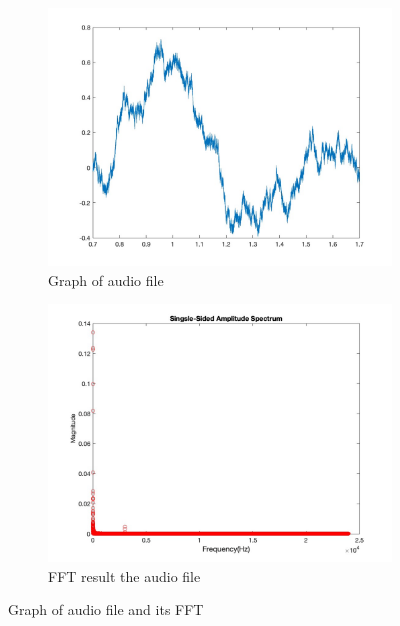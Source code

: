 \documentclass[
	a4paper,
	11pt,
]{article}
\begin{document}
\begin{figure}[h]
  \centering
  \begin{subfigure}[b]{0.45\textwidth}
    \centering
    \includegraphics[width=\linewidth]{A2/a2.image1.jpg}
    \caption{Graph of audio file}
    \label{fig:sub1}
  \end{subfigure}
  \hfill
  \begin{subfigure}[b]{0.45\textwidth}
    \centering
    \includegraphics[width=\linewidth]{A2/a2.image2.jpg}
    \caption{FFT result the audio file}
    \label{fig:sub2}
  \end{subfigure}
  \caption{Graph of audio file and its FFT}
  \label{fig:example}
\end{figure}
\end{document}
